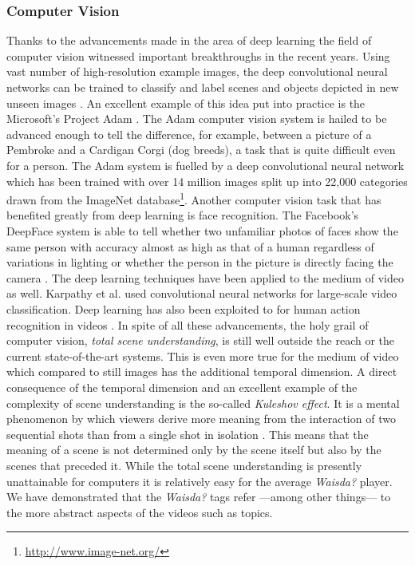\subsubsection{Computer Vision} Thanks to the advancements made in the area of deep learning \cite{Bengio:2013:RLR:2498740.2498889,Arel:2010:RFD:1921914.1921920,Schmidhuber:deep-learning} the field of computer vision witnessed important breakthroughs in the recent years. Using vast number of high-resolution example images, the deep convolutional neural networks can be trained to classify and label scenes and objects depicted in new unseen images \cite{NIPS2012_4824,10.1109/TPAMI.2012.231}. An excellent example of this idea put into practice is the Microsoft's Project Adam \cite{project-adam}. The Adam computer vision system is hailed to be advanced enough to tell the difference, for example, between a picture of a Pembroke and a Cardigan Corgi (dog breeds), a task that is quite difficult even for a person. The Adam system is fuelled by a deep convolutional neural network which has been trained with over 14 million images split up into 22,000 categories drawn from the ImageNet database\footnote{\url{http://www.image-net.org/}}. Another computer vision task that has benefited greatly from deep learning is face recognition. The Facebook's DeepFace system is able to tell whether two unfamiliar photos of faces show the same person with accuracy almost as high as that of a human regardless of variations in lighting or whether the person in the picture is directly facing the camera \cite{Taigman_2014_CVPR,DBLP:conf/cvpr/ZhangPTFB15}. The deep learning techniques have been applied to the medium of video as well. Karpathy et al. used convolutional neural networks for large-scale video classification. Deep learning has also been exploited to for human action recognition in videos \cite{DBLP:journals/corr/SimonyanZ14,Ji:2013:CNN:2412386.2412939}. In spite of all these advancements, the holy grail of computer vision, \textit{total scene understanding}, is still well outside the reach or the current state-of-the-art systems. This is even more true for the medium of video which compared to still images has the additional temporal dimension. A direct consequence of the temporal dimension and an excellent example of the complexity of scene understanding is the so-called \textit{Kuleshov effect}. It is a mental phenomenon by which viewers derive more meaning from the interaction of two sequential shots than from a single shot in isolation \cite{mobbs2006kuleshov}. This means that the meaning of a scene is not determined only by the scene itself but also by the scenes that preceded it. While the total scene understanding is presently unattainable for computers it is relatively easy for the average \textit{Waisda?} player. We have demonstrated that the \textit{Waisda?} tags refer ---among other things--- to the more abstract aspects of the videos such as topics.
